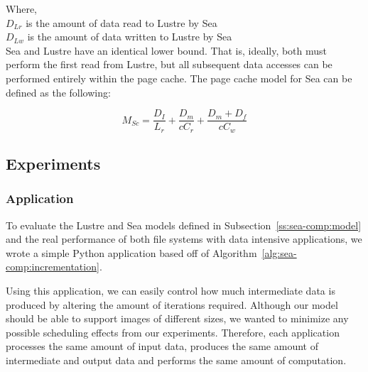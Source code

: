 \documentclass[10pt,journal,compsoc]{IEEEtran}
\begin{document}
      Where, \\
      $D_{Lr}$ is the amount of data read to Lustre by Sea \\
      $D_{Lw}$ is the amount of data written to Lustre by Sea \\


      Sea and Lustre have an identical lower bound. That is, ideally, both must
      perform the first read from Lustre, but all subsequent data accesses can
      be performed entirely within the page cache. The page cache model for Sea
      can be defined as the following:

      \begin{equation}\label{eq:sea-comp:msc}
          M_{Sc} = \frac{D_{I}}{L_{r}} + \frac{D_{m}}{cC_{r}} + \frac{D_{m} + D_{f}}{cC_{w}}
      \end{equation}
\subsection{Experiments}
\subsubsection{Application}


      To evaluate the Lustre and Sea models defined in
      Subsection~\ref{ss:sea-comp:model} and the real performance of both file
      systems with data intensive applications, we wrote a simple Python
      application based off of Algorithm~\ref{alg:sea-comp:incrementation}.
      
      Using this application, we can easily control how much intermediate data
      is produced by altering the amount of iterations required. Although our
      model should be able to support images of different sizes, we wanted to
      minimize any possible scheduling effects from our experiments. Therefore,
      each application processes the same amount of input data, produces the
      same amount of intermediate and output data and performs the same amount
      of computation.
                                                                                   
\end{document}
